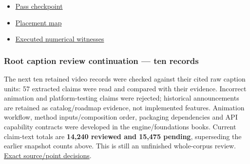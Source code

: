 \begin{itemize}
\tightlist
\item
  \hyperref[source-file-11c2637e016569462ffee75b]{Pass checkpoint}
\item
  \hyperref[source-file-64e2507d9bdbb9e50c22e3f6]{Placement map}
\item
  \hyperref[source-file-86ef5c0a10de3ddd9e55c99b]{Executed numerical witnesses}
\end{itemize}

\subsubsection{Root caption review continuation --- ten records}\label{appendix-5056f3debc1f-root-caption-review-continuation-ten-records}

The next ten retained video records were checked against their cited raw caption units: 57 extracted claims were read and compared with their evidence. Incorrect animation and platform-testing claims were rejected; historical announcements are retained as catalog/roadmap evidence, not implemented features. Animation workflow, method inputs/composition order, packaging dependencies and API capability contracts were developed in the engine/foundations books. Current claim-text totals are \textbf{14,240 reviewed and 15,475 pending}, superseding the earlier snapshot counts above. This is still an unfinished whole-corpus review. \hyperref[source-file-02ebf2c2c2c38aae0035fc9f]{Exact source/point decisions}.
